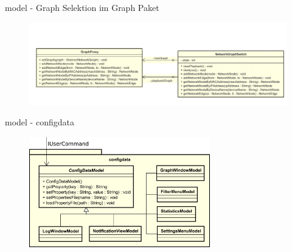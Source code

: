 \begin{frame}{model - Graph Selektion im Graph Paket}
  \begin{figure}
    \centering
    \includegraphics[width=\textwidth]{./images/graph-proxy.png}
  \end{figure}
\end{frame}

\begin{frame}{model - configdata}
  \begin{figure}
    \centering
    \includegraphics[width=0.7\textwidth]{./images/configdata.png}
  \end{figure}
\end{frame}
